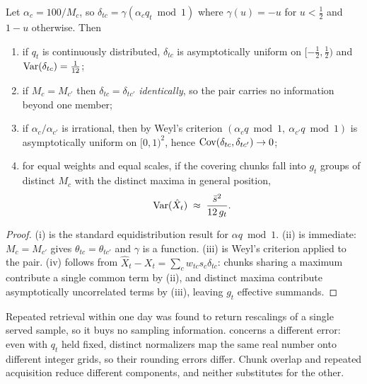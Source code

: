 \documentclass[12pt,a4paper,oneside]{article}
\begin{document}
\begin{proposition}\label{prop:rounding}
Let $\alpha_c=100/M_c$, so $\delta_{tc}=\gamma(\alpha_c q_t \bmod 1)$ where
$\gamma(u)=-u$ for $u<\tfrac12$ and $1-u$ otherwise. Then
\begin{enumerate}
\item if $q_t$ is continuously distributed, $\delta_{tc}$ is asymptotically uniform
on $[-\tfrac12,\tfrac12)$ and $\operatorname{Var}(\delta_{tc})=\tfrac1{12}$;
\item if $M_c=M_{c'}$ then $\delta_{tc}=\delta_{tc'}$ \emph{identically}, so the
pair carries no information beyond one member;
\item if $\alpha_c/\alpha_{c'}$ is irrational, then by Weyl's criterion
$(\alpha_c q\bmod 1,\ \alpha_{c'}q\bmod 1)$ is asymptotically uniform on
$[0,1)^2$, hence $\operatorname{Cov}(\delta_{tc},\delta_{tc'})\to 0$;
\item for equal weights and equal scales, if the covering chunks fall into $g_t$
groups of distinct $M_c$ with the distinct maxima in general position,
\begin{equation}
\operatorname{Var}(\hat{X}_t)\;\approx\;\frac{\bar{s}^2}{12\,g_t}.
\label{eq:roundingvar}
\end{equation}
\end{enumerate}
\end{proposition}

\begin{proof}
(i) is the standard equidistribution result for $\alpha q\bmod 1$. (ii) is
immediate: $M_c=M_{c'}$ gives $\theta_{tc}=\theta_{tc'}$ and $\gamma$ is a
function. (iii) is Weyl's criterion applied to the pair. (iv) follows from
$\hat{X}_t-X_t=\sum_c w_{tc}s_c\delta_{tc}$: chunks sharing a maximum contribute a
single common term by (ii), and distinct maxima contribute asymptotically
uncorrelated terms by (iii), leaving $g_t$ effective summands.
\end{proof}

\begin{remark}
Repeated retrieval within one day was found to return rescalings of a single
served sample, so it buys no sampling information.  concerns a
different error: even with $q_t$ held fixed, distinct normalizers map the same
real number onto different integer grids, so their rounding errors differ. Chunk
overlap and repeated acquisition reduce different components, and neither
substitutes for the other.
\end{remark}
\end{document}
